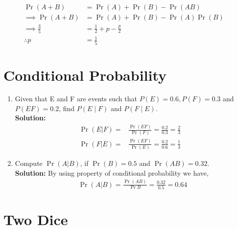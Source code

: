 \documentclass{article}
\numberwithin{equation}{subsection}
\numberwithin{figure}{subsection}
\providecommand{\pr}[1]{\ensuremath{\Pr\left(#1\right)}}
\newcommand{\solution}{\noindent \textbf{Solution: }}
\begin{document}
\begin{enumerate}
\begin{enumerate}
\begin{enumerate}
\begin{align}
\pr{A + B} &=\pr{A} + \pr{B} - \pr{A B}& 
\\
\implies \pr{A + B} &=\pr{A} + \pr{B} - \pr{A}\pr{B}&
\\
\implies \frac{3}{5}&=\frac{1}{2}+ p - \frac{p}{2}&
\\
\therefore p &= \frac{1}{5}&
\end{align}
\end{enumerate}
\end{enumerate}
\end{enumerate}
\section{Conditional Probability}
\begin{enumerate}%
\item 
Given that E and F are events such that $P(E)=0.6, P(F)=0.3$ and $P(E F)=0.2$, find $P(E \mid F)$ and $P(F \mid E)$.
\\
\solution
\begin{align}
\pr{E|F}=&\frac{\pr{E  F}}{\pr{F}}=\frac{0.2}{0.3}=\frac{2}{3}&  
\\
\pr{F|E}=&\frac{\pr{E  F}}{\pr{E}}=\frac{0.2}{0.6}=\frac{1}{3}&  
\end{align}
	\item Compute $\pr{A|B}$, if $\pr{B}=0.5$ and $\pr{AB}=0.32$. 
		\\
\solution
By using property of conditional probability we have,
\begin{align}
\pr{A|B}=\frac{\pr{AB}}{\Pr{B}}=\frac{0.32}{0.5}=0.64
\end{align}
\end{enumerate}
\section{Two Dice}
\end{document}
